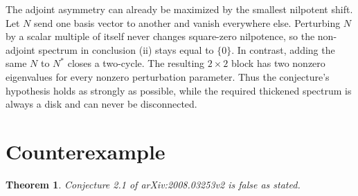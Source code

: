 \documentclass[11pt]{article}
\newtheorem{theorem}{Theorem}
\begin{document}
The adjoint asymmetry can already be maximized by the smallest nilpotent
shift. Let $N$ send one basis vector to another and vanish everywhere else.
Perturbing $N$ by a scalar multiple of itself never changes square-zero
nilpotence, so the non-adjoint spectrum in conclusion (ii) stays equal to
$\{0\}$. In contrast, adding the same $N$ to $N^*$ closes a two-cycle. The
resulting $2\times2$ block has two nonzero eigenvalues for every nonzero
perturbation parameter. Thus the conjecture's hypothesis holds as strongly as
possible, while the required thickened spectrum is always a disk and can
never be disconnected.

\section{Counterexample}

\begin{theorem}\label{thm:counterexample}
Conjecture 2.1 of arXiv:2008.03253v2 is false as stated.
\end{theorem}
\end{document}
